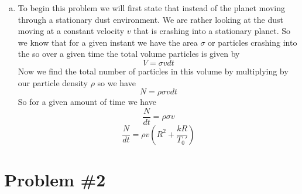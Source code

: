 \documentclass[11pt]{article}
\numberwithin{equation}{section}
\begin{document}
\begin{enumerate}[(a)]
\item
To begin this problem we will first state that instead of the planet moving through a stationary dust environment. We are rather looking at the dust moving at a constant velocity $v$ that is crashing into a stationary planet. So we know that for a given instant we have the area $\sigma$ or particles crashing into the so over a given time the total volume particles is given by
$$V=\sigma vdt$$
Now we find the total number of particles in this volume by multiplying by our particle density $\rho$ so we have
$$N = \rho\sigma vdt$$
So for a given amount of time we have
$$\frac{N}{dt}=\rho\sigma v$$
$$\frac{N}{dt}=\rho v\left(R^2+\frac{kR}{T_0'}\right)$$
\end{enumerate}

\section{Problem \#2}
\end{document}
